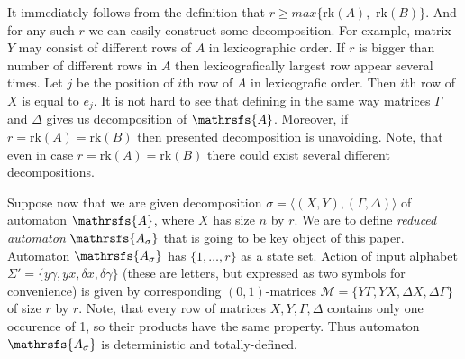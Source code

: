 \documentclass[11pt]{llncs}
\newcommand{\A}{\mathrsfs{A}}
\newcommand{\AD}{\mathrsfs{A_{\sigma}}}
\newcommand{\G}{\Gamma}
\newcommand{\D}{\Delta}
\newcommand{\g}{\gamma}
\newcommand{\dl}{\delta}
\newcommand{\rk}{\mathrm{rk}}
\begin{document}
It immediately follows from the definition that $r \geq max\{\rk(A),$ $\rk(B)\}$.
And for any such $r$ we can easily construct some decomposition. 
For example, matrix $Y$ may consist of different rows of $A$ in lexicographic order.
If $r$ is bigger than number of different rows in $A$ then lexicografically largest row 
appear several times. Let $j$ be the position of $i$th row of $A$ in lexicografic order.
Then $i$th row of $X$ is equal to $e_j$. It is not hard to see that defining in the 
same way matrices $\G$ and $\D$ gives us decomposition of $\A$. Moreover,
if $r = \rk(A) = \rk(B)$ then presented decomposition is unavoiding. Note, that even in case
$r = \rk(A) = \rk(B)$ there could exist several different decompositions.

Suppose now that we are given decomposition $\sigma = \langle(X,Y), (\G,\D)\rangle$ of 
automaton $\A$, where $X$ has size $n$ by $r$.
We are to define \emph{reduced automaton} $\AD$ that is going to be key object of this paper.
Automaton $\AD$ has $\{1,\ldots, r\}$ as a state
set. Action of input alphabet $\Sigma' = \{ y\g, yx, \dl x, \dl\g \}$ (these are letters, 
but expressed as two symbols for convenience) is given
by corresponding $(0,1)$-matrices $\mathcal{M} =\{ Y\G , YX, \D X, \D\G \}$ of size $r$ by $r$.
Note, that every row of matrices $X, Y, \G, \D$ contains only one occurence of 1, 
so their products have the same property. Thus automaton $\AD$
is deterministic and totally-defined.

\end{document}

